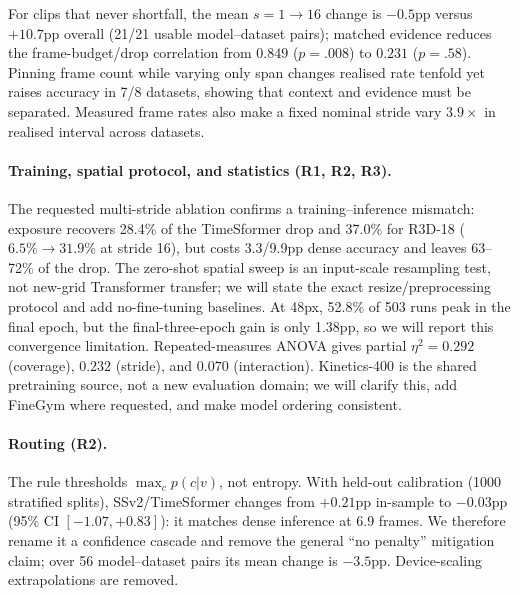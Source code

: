 \documentclass[10pt,twocolumn,letterpaper]{article}
\begin{document}
For clips that never shortfall, the mean $s{=}1\to16$ change is $-0.5$pp versus
$+10.7$pp overall (21/21 usable model--dataset pairs); matched evidence reduces
the frame-budget/drop correlation from $0.849$ ($p=.008$) to $0.231$ ($p=.58$).
Pinning frame count while varying only span changes realised rate tenfold yet
raises accuracy in 7/8 datasets, showing that context and evidence must be
separated. Measured frame rates also make a fixed nominal stride vary $3.9\times$
in realised interval across datasets.

\paragraph{Training, spatial protocol, and statistics (R1, R2, R3).}
The requested multi-stride ablation confirms a training--inference mismatch:
exposure recovers 28.4\% of the TimeSformer drop and 37.0\% for R3D-18
($6.5\%\!\to\!31.9\%$ at stride 16), but costs 3.3/9.9pp dense accuracy and
leaves 63--72\% of the drop. The zero-shot spatial sweep is an input-scale
resampling test, not new-grid Transformer transfer; we will state the exact
resize/preprocessing protocol and add no-fine-tuning baselines. At 48px, 52.8\%
of 503 runs peak in the final epoch, but the final-three-epoch gain is only
1.38pp, so we will report this convergence limitation. Repeated-measures ANOVA
gives partial $\eta^2{=}0.292$ (coverage), $0.232$ (stride), and $0.070$
(interaction). Kinetics-400 is the shared pretraining source, not a new
evaluation domain; we will clarify this, add FineGym where requested, and make
model ordering consistent.

\paragraph{Routing (R2).}
The rule thresholds $\max_c p(c|v)$, not entropy. With held-out calibration
(1000 stratified splits), SSv2/TimeSformer changes from $+0.21$pp in-sample to
$-0.03$pp (95\% CI $[-1.07,+0.83]$): it matches dense inference at 6.9 frames.
We therefore rename it a confidence cascade and remove the general ``no
penalty'' mitigation claim; over 56 model--dataset pairs its mean change is
$-3.5$pp. Device-scaling extrapolations are removed.
\end{document}
